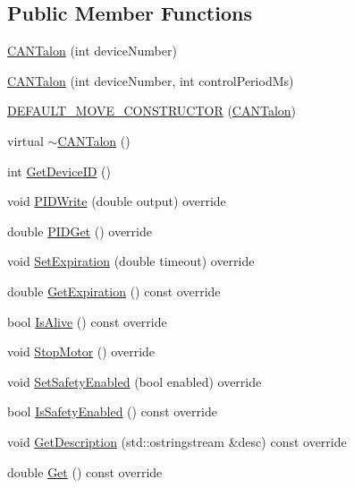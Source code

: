 \subsection*{Public Member Functions}
\begin{DoxyCompactItemize}
\item 
\hyperlink{class_c_a_n_talon_ab22fe4f31e8d2e21011610833f96de58}{C\+A\+N\+Talon} (int device\+Number)
\item 
\hyperlink{class_c_a_n_talon_afe5efd7f2c7b1fb3c6b818eb3d4617d7}{C\+A\+N\+Talon} (int device\+Number, int control\+Period\+Ms)
\item 
\hyperlink{class_c_a_n_talon_a31581c5215ebe60fe89dbce78468627a}{D\+E\+F\+A\+U\+L\+T\+\_\+\+M\+O\+V\+E\+\_\+\+C\+O\+N\+S\+T\+R\+U\+C\+T\+OR} (\hyperlink{class_c_a_n_talon}{C\+A\+N\+Talon})
\item 
virtual \hyperlink{class_c_a_n_talon_a1f2577ad1683495db9ada33f71968df0}{$\sim$\+C\+A\+N\+Talon} ()
\item 
int \hyperlink{class_c_a_n_talon_a68641c5f1b7ae5ca4683d8ad3521c275}{Get\+Device\+ID} ()
\item 
void \hyperlink{class_c_a_n_talon_a544ae037c202cb4e97c2ef8fd68b005b}{P\+I\+D\+Write} (double output) override
\item 
double \hyperlink{class_c_a_n_talon_affb8fef48a657c5a4d60ef5b76664091}{P\+I\+D\+Get} () override
\item 
void \hyperlink{class_c_a_n_talon_ae1f3bf6c3bfa5ebc2ef95367d995bd0d}{Set\+Expiration} (double timeout) override
\item 
double \hyperlink{class_c_a_n_talon_ae81697fca7c681183e25dceee64c6c26}{Get\+Expiration} () const override
\item 
bool \hyperlink{class_c_a_n_talon_a4d26bc07e4d13a3292be1b9152439182}{Is\+Alive} () const override
\item 
void \hyperlink{class_c_a_n_talon_ac4dab826cbcb67e04ba7c734dfb088bb}{Stop\+Motor} () override
\item 
void \hyperlink{class_c_a_n_talon_a1259a78f4e90554be7227a77030aad12}{Set\+Safety\+Enabled} (bool enabled) override
\item 
bool \hyperlink{class_c_a_n_talon_a4305b1c9d5f9459702bfa68c44b0887f}{Is\+Safety\+Enabled} () const override
\item 
void \hyperlink{class_c_a_n_talon_af5fcf549829342563fc9bcb60760fafd}{Get\+Description} (std\+::ostringstream \&desc) const override
\item 
double \hyperlink{class_c_a_n_talon_a6819f1eae4eefb39c441a3b8e973613d}{Get} () const override

\end{DoxyCompactItemize}
